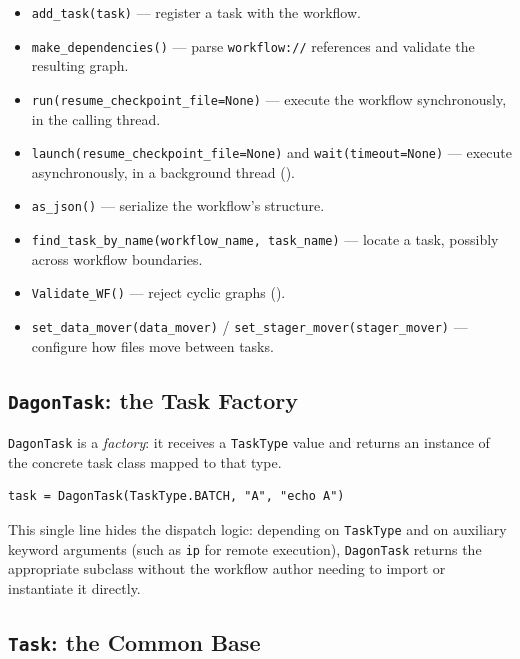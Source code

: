 \begin{itemize}[leftmargin=1.4em]
  \item \texttt{add\_task(task)} --- register a task with the workflow.
  \item \texttt{make\_dependencies()} --- parse \texttt{workflow://}
    references and validate the resulting graph.
  \item \texttt{run(resume\_checkpoint\_file=None)} --- execute the workflow
    synchronously, in the calling thread.
  \item \texttt{launch(resume\_checkpoint\_file=None)} and
    \texttt{wait(timeout=None)} --- execute asynchronously, in a background
    thread ().
  \item \texttt{as\_json()} --- serialize the workflow's structure.
  \item \texttt{find\_task\_by\_name(workflow\_name, task\_name)} --- locate a
    task, possibly across workflow boundaries.
  \item \texttt{Validate\_WF()} --- reject cyclic graphs ().
  \item \texttt{set\_data\_mover(data\_mover)} /
    \texttt{set\_stager\_mover(stager\_mover)} --- configure how files move
    between tasks.
\end{itemize}

\subsection{\texttt{DagonTask}: the Task Factory}

\texttt{DagonTask} is a \emph{factory}: it receives a \texttt{TaskType} value
and returns an instance of the concrete task class mapped to that type.

\begin{lstlisting}[caption={\texttt{DagonTask} as a factory over concrete task classes.}]
task = DagonTask(TaskType.BATCH, "A", "echo A")
\end{lstlisting}

This single line hides the dispatch logic: depending on \texttt{TaskType} and
on auxiliary keyword arguments (such as \texttt{ip} for remote execution),
\texttt{DagonTask} returns the appropriate subclass without the workflow
author needing to import or instantiate it directly.

\subsection{\texttt{Task}: the Common Base}

